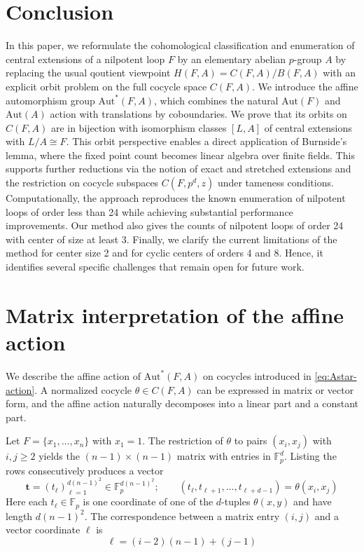 \documentclass[12pt,a4paper]{amsart}
\theoremstyle{definition}
\begin{document}
\section{Conclusion}

In this paper, we reformulate the cohomological classification and enumeration of central extensions of a nilpotent loop $F$ by an elementary abelian $p$-group $A$ by replacing the usual qoutient viewpoint $H(F,A)=C(F,A)/B(F,A)$ with an explicit orbit problem on the full cocycle space $C(F,A)$. We introduce the affine automorphism group  $\mathrm{Aut}^{\!*}(F,A)$, which combines the natural  $\mathrm{Aut}(F)$ and $\mathrm{Aut}(A)$ action with translations by coboundaries. We prove that its orbits on $C(F,A)$ are in bijection with isomorphism classes $[L,A]$ of central extensions with $L/A \cong F$. This orbit perspective enables a direct application of Burnside's lemma, where the fixed point count becomes linear algebra over finite fields. This supports further reductions via the notion of exact and stretched extensions and the restriction on cocycle subspaces $C(F,p^d,z)$ under tameness conditions. Computationally, the approach reproduces the known enumeration of nilpotent loops of order less than 24 while achieving substantial performance improvements. Our method also gives the counts of nilpotent loops of order 24 with center of size at least 3. Finally, we clarify the current limitations of the method for center size 2 and for cyclic centers of orders 4 and 8. Hence, it identifies several specific challenges that remain open for future work.









\appendix

\section{Matrix interpretation of the affine action}\label{app:matrix}

We describe the affine action of $\mathrm{Aut}^{\!*}(F,A)$ on cocycles introduced in \eqref{eq:Astar-action}. 
A normalized cocycle $\theta\in C(F, A)$ can be expressed in matrix or vector form, and the affine action naturally decomposes into a linear part and a constant part.

Let $F=\{x_1,\dots,x_n\}$ with $x_1=1$. 
The restriction of $\theta$ to pairs $(x_i,x_j)$ with $i,j\ge 2$ yields the $(n-1) \times (n-1)$
matrix with entries in $\mathbb{F}_p^d$. Listing the rows consecutively produces a vector 
\[
\mathbf{t}= (t_{\ell})_{\ell=1}^{d(n-1)^{2}} \in \mathbb{F}_{p}^{d{(n-1)^{2}}};
\qquad
(t_{\ell},t_{\ell+1},\ldots,t_{\ell+d-1}) = \theta(x_{i},x_{j})
\]
Here each $t_\ell \in \mathbb{F}_{p}$ is one coordinate of one of the $d$-tuples $\theta(x,y)$ and have length $d(n-1)^2$.
The correspondence between a matrix entry $(i,j)$ and a vector coordinate $\ell$ is
\[
\ell=(i-2)(n-1)+(j-1)
\]
\end{document}
